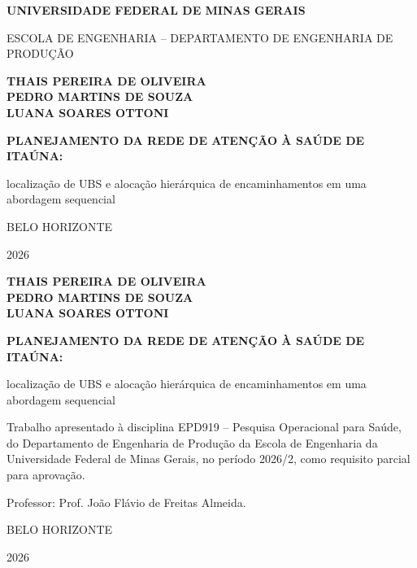 \documentclass[12pt,a4paper,oneside]{report}
\newcommand{\instituicao}{Universidade Federal de Minas Gerais}
\newcommand{\curso}{Escola de Engenharia -- Departamento de Engenharia de Produção}
\newcommand{\autores}{Thais Pereira de Oliveira\\Pedro Martins de Souza\\Luana Soares Ottoni}
\newcommand{\orientador}{Prof. João Flávio de Freitas Almeida}
\newcommand{\cidade}{Belo Horizonte}
\newcommand{\ano}{2026}
\newcommand{\titulo}{Planejamento da rede de atenção à saúde de Itaúna}
\newcommand{\subtitulo}{localização de UBS e alocação hierárquica de encaminhamentos em uma abordagem sequencial}
\begin{document}
\hypersetup{pageanchor=false}

\begin{titlepage}
\centering
{\bfseries\MakeUppercase{\instituicao}\par}
{\MakeUppercase{\curso}\par}
\vspace{2.5cm}
{\bfseries\MakeUppercase{\autores}\par}
\vfill
{\bfseries\large\MakeUppercase{\titulo}:\par}
{\large\subtitulo\par}
\vfill
{\MakeUppercase{\cidade}\par}
{\ano\par}
\end{titlepage}

\begin{titlepage}
\centering
{\bfseries\MakeUppercase{\autores}\par}
\vspace{4cm}
{\bfseries\large\MakeUppercase{\titulo}:\par}
{\large\subtitulo\par}
\vspace{2cm}
\hspace*{.45\linewidth}\begin{minipage}{.55\linewidth}
\singlespacing\small
Trabalho apresentado à disciplina EPD919 -- Pesquisa Operacional para Saúde, do Departamento de
Engenharia de Produção da Escola de Engenharia da \instituicao{}, no período 2026/2, como requisito
parcial para aprovação.\par
\vspace{8pt}
Professor: \orientador.
\end{minipage}
\vfill
{\MakeUppercase{\cidade}\par}
{\ano\par}
\end{titlepage}

\hypersetup{pageanchor=true}
\pagestyle{textual}
\end{document}
